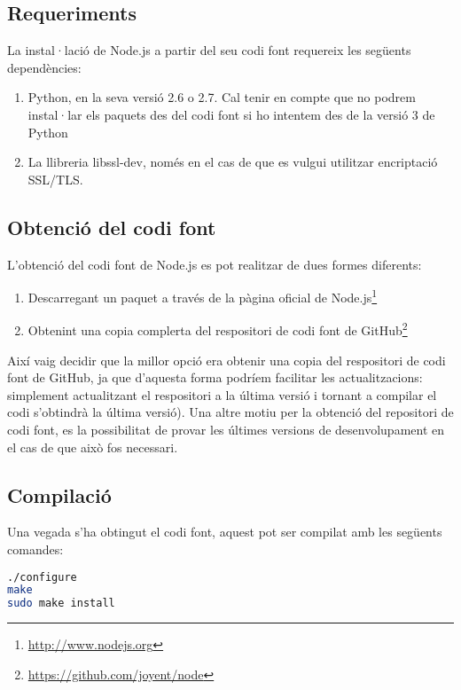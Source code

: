 \subsection{Requeriments}

La instal·lació de Node.js a partir del seu codi font requereix les següents dependències:

\begin{enumerate}
    \item{Python, en la seva versió 2.6 o 2.7. Cal tenir en compte que no podrem instal·lar els paquets des del codi font si ho intentem des de la versió 3 de Python}
    \item{La llibreria libssl-dev, només en el cas de que es vulgui utilitzar encriptació SSL/TLS. }
\end{enumerate}

\subsection{Obtenció del codi font}

L'obtenció del codi font de Node.js es pot realitzar de dues formes diferents: 

\begin{enumerate}
    \item{Descarregant un paquet a través de la pàgina oficial de Node.js\footnote{\url{http://www.nodejs.org}}}
    \item{Obtenint una copia complerta del respositori de codi font de GitHub\footnote{\url{https://github.com/joyent/node}}}
\end{enumerate}

Així vaig decidir que la millor opció era obtenir una copia del respositori de codi font de GitHub, ja que d'aquesta forma podríem facilitar les actualitzacions: simplement actualitzant el respositori a la última versió i tornant a compilar el codi s'obtindrà la última versió). Una altre motiu per la obtenció del repositori de codi font, es la possibilitat de provar les últimes versions de desenvolupament en el cas de que això fos necessari.  

\subsection{Compilació}

Una vegada s'ha obtingut el codi font, aquest pot ser compilat amb les següents comandes:  
\begin{lstlisting}[language=bash]
./configure
make
sudo make install
\end{lstlisting}

